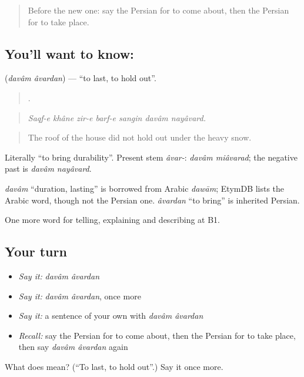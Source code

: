 \label{lesson:FA-C301-davam-avardan}



\begin{quote}
Before the new one: say the Persian for to come about, then the Persian for to take place.
\end{quote}

\subsection*{You'll want to know:  }
\textbf{ } (\emph{davâm âvardan}) — \textquotedblleft{}to last, to hold out\textquotedblright{}.

\begin{quote}
      .
\end{quote}

\begin{quote}
\emph{Saqf-e khâne zir-e barf-e sangin davâm nayâvard.}
\end{quote}

\begin{quote}
The roof of the house did not hold out under the heavy snow.
\end{quote}

Literally \textquotedblleft{}to bring durability\textquotedblright{}. Present stem \emph{âvar-}: \emph{davâm miâvarad}; the negative past is \emph{davâm nayâvard}.

\begin{cousinweb}
\emph{davâm} \textquotedblleft{}duration, lasting\textquotedblright{} is borrowed from Arabic \emph{dawām}; EtymDB lists the Arabic word, though not the Persian one. \emph{âvardan} \textquotedblleft{}to bring\textquotedblright{} is inherited Persian.
\end{cousinweb}

\begin{grammarlens}[title={What you've built}]
One more word for telling, explaining and describing at B1.
\end{grammarlens}

\subsection*{Your turn}
\begin{itemize}
\raggedright
  \item \emph{Say it:} \emph{davâm âvardan}
  \item \emph{Say it:} \emph{davâm âvardan}, once more
  \item \emph{Say it:} a sentence of your own with \emph{davâm âvardan}
  \item \emph{Recall:} say the Persian for to come about, then the Persian for to take place, then say \emph{davâm âvardan} again
\end{itemize}

\begin{tcolorbox}[breakable,colback=teal!4,colframe=teal!35!black,title={Before you move on}]
What does   mean? (\textquotedblleft{}To last, to hold out\textquotedblright{}.) Say it once more.
\end{tcolorbox}
